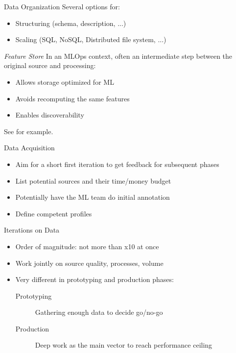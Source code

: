 \begin{frame}{Data Organization}
  Several options for:
  \begin{itemize}
    \item Structuring (schema, description, ...)
    \item Scaling (SQL, NoSQL, Distributed file system, ...)
  \end{itemize}
\end{frame}

\begin{frame}{\textit{Feature Store}}
  In an MLOps context, often an intermediate step between the original source and processing:
  
  \begin{itemize}
    \item Allows storage optimized for ML
    \item Avoids recomputing the same features
    \item Enables discoverability
  \end{itemize}
  
  See  for example.
\end{frame}

\begin{frame}{Data Acquisition}
  \begin{itemize}
    \item Aim for a short first iteration to get feedback for subsequent phases
    \item List potential sources and their time/money budget
    \item Potentially have the ML team do initial annotation
    \item Define competent profiles
  \end{itemize}
\end{frame}

\begin{frame}{Iterations on Data}
  \begin{itemize}
    \item Order of magnitude: not more than x10 at once
    \item Work jointly on source quality, processes, volume
    \item Very different in prototyping and production phases:
      \begin{description}
        \item[Prototyping] Gathering enough data to decide go/no-go
        \item[Production] Deep work as the main vector to reach performance ceiling
      \end{description}
  \end{itemize}
\end{frame}

